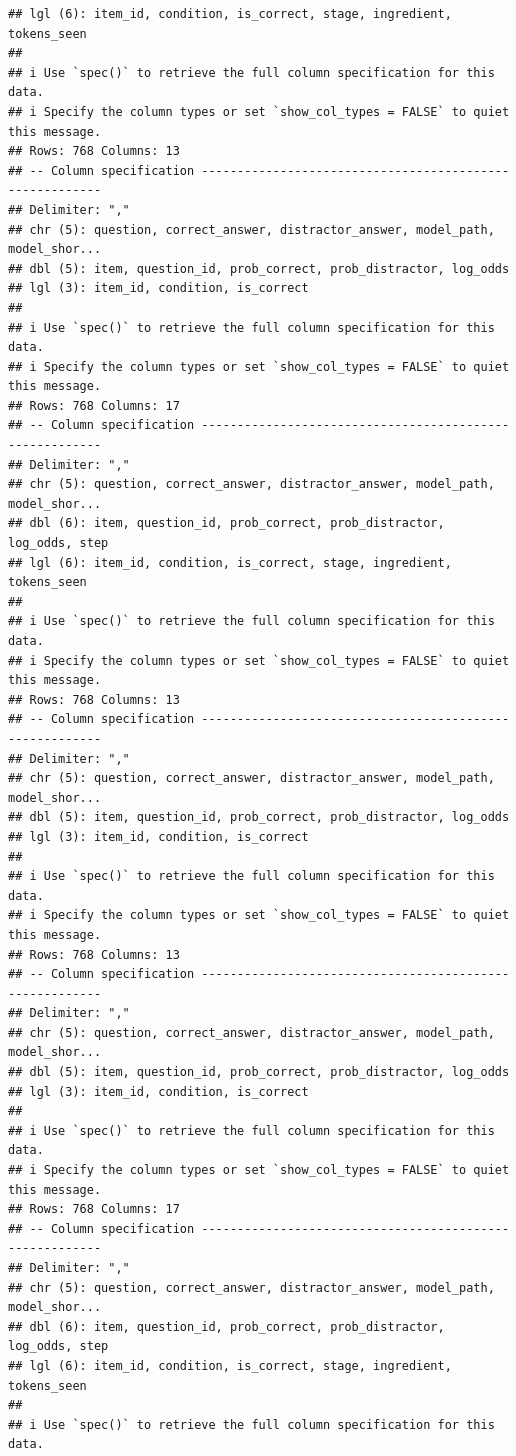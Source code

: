 \documentclass[
]{article}
\begin{document}
\begin{verbatim}
## lgl (6): item_id, condition, is_correct, stage, ingredient, tokens_seen
## 
## i Use `spec()` to retrieve the full column specification for this data.
## i Specify the column types or set `show_col_types = FALSE` to quiet this message.
## Rows: 768 Columns: 13
## -- Column specification --------------------------------------------------------
## Delimiter: ","
## chr (5): question, correct_answer, distractor_answer, model_path, model_shor...
## dbl (5): item, question_id, prob_correct, prob_distractor, log_odds
## lgl (3): item_id, condition, is_correct
## 
## i Use `spec()` to retrieve the full column specification for this data.
## i Specify the column types or set `show_col_types = FALSE` to quiet this message.
## Rows: 768 Columns: 17
## -- Column specification --------------------------------------------------------
## Delimiter: ","
## chr (5): question, correct_answer, distractor_answer, model_path, model_shor...
## dbl (6): item, question_id, prob_correct, prob_distractor, log_odds, step
## lgl (6): item_id, condition, is_correct, stage, ingredient, tokens_seen
## 
## i Use `spec()` to retrieve the full column specification for this data.
## i Specify the column types or set `show_col_types = FALSE` to quiet this message.
## Rows: 768 Columns: 13
## -- Column specification --------------------------------------------------------
## Delimiter: ","
## chr (5): question, correct_answer, distractor_answer, model_path, model_shor...
## dbl (5): item, question_id, prob_correct, prob_distractor, log_odds
## lgl (3): item_id, condition, is_correct
## 
## i Use `spec()` to retrieve the full column specification for this data.
## i Specify the column types or set `show_col_types = FALSE` to quiet this message.
## Rows: 768 Columns: 13
## -- Column specification --------------------------------------------------------
## Delimiter: ","
## chr (5): question, correct_answer, distractor_answer, model_path, model_shor...
## dbl (5): item, question_id, prob_correct, prob_distractor, log_odds
## lgl (3): item_id, condition, is_correct
## 
## i Use `spec()` to retrieve the full column specification for this data.
## i Specify the column types or set `show_col_types = FALSE` to quiet this message.
## Rows: 768 Columns: 17
## -- Column specification --------------------------------------------------------
## Delimiter: ","
## chr (5): question, correct_answer, distractor_answer, model_path, model_shor...
## dbl (6): item, question_id, prob_correct, prob_distractor, log_odds, step
## lgl (6): item_id, condition, is_correct, stage, ingredient, tokens_seen
## 
## i Use `spec()` to retrieve the full column specification for this data.

\end{verbatim}
\end{document}
